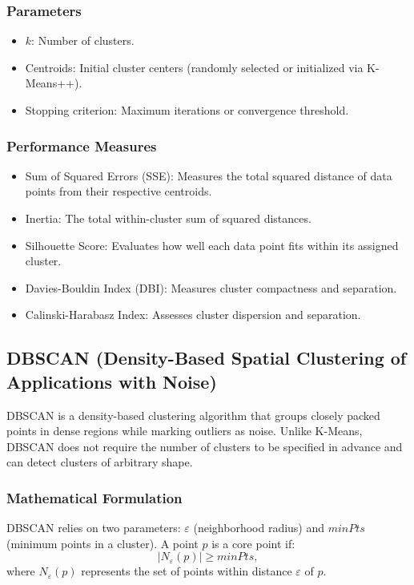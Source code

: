 \documentclass{article}
\begin{document}
\subsubsection{Parameters}
\begin{itemize}
    \item $k$: Number of clusters.
    \item Centroids: Initial cluster centers (randomly selected or initialized via K-Means++).
    \item Stopping criterion: Maximum iterations or convergence threshold.
\end{itemize}

\subsubsection{Performance Measures}
\begin{itemize}
    \item Sum of Squared Errors (SSE): Measures the total squared distance of data points from their respective centroids.
    \item Inertia: The total within-cluster sum of squared distances.
    \item Silhouette Score: Evaluates how well each data point fits within its assigned cluster.
    \item Davies-Bouldin Index (DBI): Measures cluster compactness and separation.
    \item Calinski-Harabasz Index: Assesses cluster dispersion and separation.
\end{itemize}

\subsection{DBSCAN (Density-Based Spatial Clustering of Applications with Noise)}
DBSCAN is a density-based clustering algorithm that groups closely packed points in dense regions while marking outliers as noise. Unlike K-Means, DBSCAN does not require the number of clusters to be specified in advance and can detect clusters of arbitrary shape.

\subsubsection{Mathematical Formulation}
DBSCAN relies on two parameters: $\varepsilon$ (neighborhood radius) and $minPts$ (minimum points in a cluster). A point $p$ is a core point if:
\begin{equation}
|N_{\varepsilon}(p)| \geq minPts,
\end{equation}
where $N_{\varepsilon}(p)$ represents the set of points within distance $\varepsilon$ of $p$.
\end{document}
